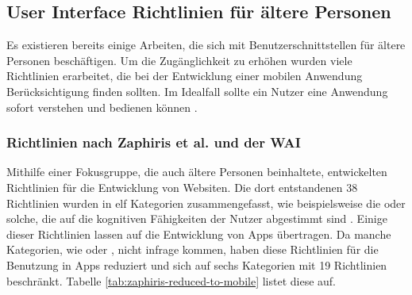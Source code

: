 \subsection{User Interface Richtlinien für ältere Personen}

Es existieren bereits einige Arbeiten, die sich mit Benutzerschnittstellen für ältere Personen beschäftigen. Um die Zugänglichkeit zu erhöhen wurden viele Richtlinien erarbeitet, die bei der Entwicklung einer mobilen Anwendung Berücksichtigung finden sollten. Im Idealfall sollte ein Nutzer eine Anwendung sofort verstehen und bedienen können \cite{Kivimaki:2013:User-Interface-for-Social}.

\subsubsection{Richtlinien nach Zaphiris et al. und der WAI}

Mithilfe einer Fokusgruppe, die auch ältere Personen beinhaltete, entwickelten \citeauthor{Zaphiris:2005:Age-Centered-Research-Based-Web-Design} Richtlinien für die Entwicklung von Websiten. Die dort entstandenen 38 Richtlinien wurden in elf Kategorien zusammengefasst, wie beispielsweise die  oder solche, die auf die kognitiven Fähigkeiten der Nutzer abgestimmt sind \cite{Zaphiris:2005:Age-Centered-Research-Based-Web-Design}\cite{Kurniawan:2005:Research-Derived-Web-Design-Guidelines}.
Einige dieser Richtlinien lassen auf die Entwicklung von Apps übertragen. Da manche Kategorien, wie  oder , nicht infrage kommen, haben \textcite{Diaz-Bossini:2014:Accessibility-to-Mobile-Interfaces} diese Richtlinien für die Benutzung in Apps reduziert und sich auf sechs Kategorien mit 19 Richtlinien beschränkt. Tabelle \ref{tab:zaphiris-reduced-to-mobile} listet diese auf.


